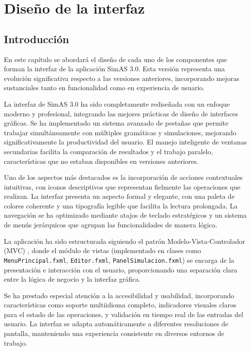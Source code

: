 \chapter{Diseño de la interfaz} \label{cap:diseño_interfaz}

 \section{Introducción}

En este capítulo se abordará el diseño de cada uno de los componentes que forman la interfaz de la aplicación SimAS 3.0. Esta versión representa una evolución significativa respecto a las versiones anteriores, incorporando mejoras sustanciales tanto en funcionalidad como en experiencia de usuario.

La interfaz de SimAS 3.0 ha sido completamente rediseñada con un enfoque moderno y profesional, integrando las mejores prácticas de diseño de interfaces gráficas. Se ha implementado un sistema avanzado de pestañas que permite trabajar simultáneamente con múltiples gramáticas y simulaciones, mejorando significativamente la productividad del usuario. El manejo inteligente de ventanas secundarias facilita la comparación de resultados y el trabajo paralelo, características que no estaban disponibles en versiones anteriores.

Uno de los aspectos más destacados es la incorporación de acciones contextuales intuitivas, con iconos descriptivos que representan fielmente las operaciones que realizan. La interfaz presenta un aspecto formal y elegante, con una paleta de colores coherente y una tipografía legible que facilita la lectura prolongada. La navegación se ha optimizado mediante atajos de teclado estratégicos y un sistema de menús jerárquicos que agrupan las funcionalidades de manera lógica.

La aplicación ha sido estructurada siguiendo el patrón Modelo-Vista-Controlador (MVC) \cite{mvc-pattern}, donde el módulo de vistas (implementado en clases como \texttt{MenuPrincipal.fxml}, \texttt{Editor.fxml}, \texttt{PanelSimulacion.fxml}) se encarga de la presentación e interacción con el usuario, proporcionando una separación clara entre la lógica de negocio y la interfaz gráfica.

Se ha prestado especial atención a la accesibilidad y usabilidad, incorporando características como soporte multiidioma completo, indicadores visuales claros para el estado de las operaciones, y validación en tiempo real de las entradas del usuario. La interfaz se adapta automáticamente a diferentes resoluciones de pantalla, manteniendo una experiencia consistente en diversos entornos de trabajo.

